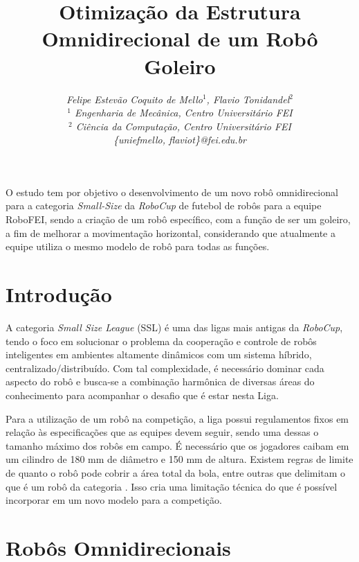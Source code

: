 \documentclass[a4paper,10pt,twocolumn,fleqn]{article}
\date{\vspace{-5ex}}
\date{}
\author{
            \textit{Felipe Estevão Coquito de Mello$^{1}$, Flavio Tonidandel$^{2}$} \\
            \textit{$^{1}$ Engenharia de Mecânica, Centro Universitário FEI} \\
            \textit{$^{2}$ Ciência da Computação, Centro Universitário FEI} \\
            \textit{\{uniefmello, flaviot\}@fei.edu.br}
    }
\begin{document}
 
        
    \title{\vspace{-2em}\textbf{Otimização da Estrutura Omnidirecional de um Robô Goleiro}}
   
   
    \maketitle
    \thispagestyle{fancy}
    
    
    \begin{resumo}
   O estudo tem por objetivo o desenvolvimento de um novo robô omnidirecional para a categoria \textit{Small-Size} da \textit{RoboCup} de futebol de robôs para a equipe RoboFEI, sendo a criação de um robô específico, com a função de ser um goleiro, a fim de melhorar a movimentação horizontal, considerando que atualmente a equipe utiliza o mesmo modelo de robô para todas as funções.
    \end{resumo}
    
    \section{Introdução}
    
    A categoria \textit{Small Size League} (SSL) é uma das ligas mais antigas da \textit{RoboCup}, tendo o foco em solucionar o problema da cooperação e controle de robôs inteligentes em ambientes altamente dinâmicos com um sistema híbrido, centralizado/distribuído. Com tal complexidade, é necessário dominar cada aspecto do robô e busca-se a combinação harmônica de diversas áreas do conhecimento para acompanhar o desafio que é estar nesta Liga.

    Para a utilização de um robô na competição, a liga possui regulamentos fixos em relação às especificações que as equipes devem seguir, sendo uma dessas o tamanho máximo dos robôs em campo. É necessário que os jogadores caibam em um cilindro de 180 mm de diâmetro e 150 mm de altura. Existem regras de limite de quanto o robô pode cobrir a área total da bola, entre outras que delimitam o que é um robô da categoria \cite{rules}. Isso cria uma limitação técnica do que é possível incorporar em um novo modelo para a competição. 

    \section{Robôs Omnidirecionais}
    
\end{document}
